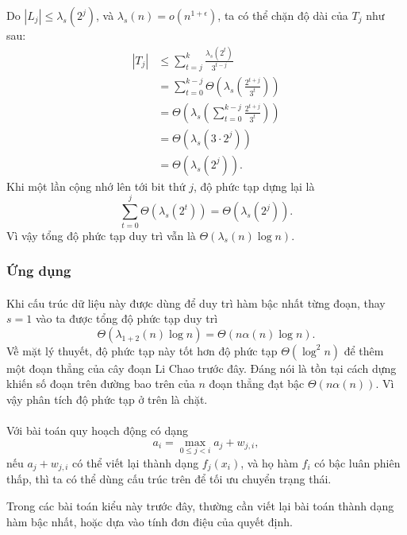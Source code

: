 \documentclass[11pt]{article}
\begin{document}
Do \(|L_j|\le\lambda_s(2^j)\), và \(\lambda_s(n)=o(n^{1+\epsilon})\), ta có thể
chặn độ dài của \(T_j\) như sau:
\[
\begin{aligned}
|T_j|
&\le \sum_{t=j}^k \frac{\lambda_s(2^t)}{3^{t-j}}\\
&= \sum_{t=0}^{k-j}\Theta\!\left(\lambda_s\!\left(\frac{2^{t+j}}{3^t}\right)\right)\\
&= \Theta\!\left(\lambda_s\!\left(\sum_{t=0}^{k-j}
      \frac{2^{t+j}}{3^t}\right)\right)\\
&= \Theta(\lambda_s(3\cdot 2^j))\\
&= \Theta(\lambda_s(2^j)).
\end{aligned}
\]
Khi một lần cộng nhớ lên tới bit thứ \(j\), độ phức tạp dựng lại là
\[
  \sum_{t=0}^j \Theta(\lambda_s(2^t))=\Theta(\lambda_s(2^j)).
\]
Vì vậy tổng độ phức tạp duy trì vẫn là \(\Theta(\lambda_s(n)\log n)\).

\subsubsection{Ứng dụng}

\paragraph{}
Khi cấu trúc dữ liệu này được dùng để duy trì hàm bậc nhất từng đoạn, thay
\(s=1\) vào ta được tổng độ phức tạp duy trì
\[
  \Theta(\lambda_{1+2}(n)\log n)=\Theta(n\alpha(n)\log n).
\]
Về mặt lý thuyết, độ phức tạp này tốt hơn độ phức tạp \(\Theta(\log^2 n)\) để
thêm một đoạn thẳng của cây đoạn Li Chao trước đây. Đáng nói là tồn tại cách
dựng khiến số đoạn trên đường bao trên của \(n\) đoạn thẳng đạt bậc
\(\Theta(n\alpha(n))\). Vì vậy phân tích độ phức tạp ở trên là chặt.

\paragraph{}
Với bài toán quy hoạch động có dạng
\[
  a_i=\max_{0\le j<i} a_j+w_{j,i},
\]
nếu \(a_j+w_{j,i}\) có thể viết lại thành dạng \(f_j(x_i)\), và họ hàm \(f_i\)
có bậc luân phiên thấp, thì ta có thể dùng cấu trúc trên để tối ưu chuyển trạng
thái.

Trong các bài toán kiểu này trước đây, thường cần viết lại bài toán thành dạng
hàm bậc nhất, hoặc dựa vào tính đơn điệu của quyết định.
\end{document}
